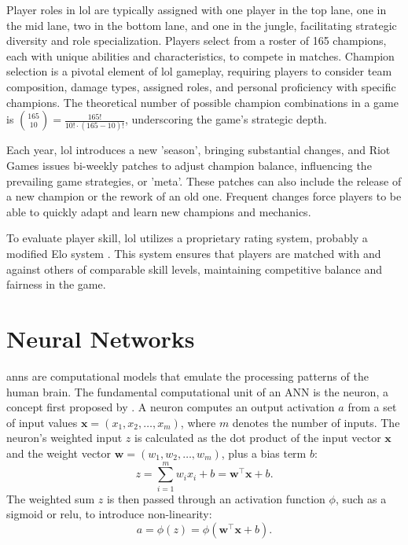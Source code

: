 \documentclass[12pt, a4paper, headinclude, twoside, plainheadsepline, open=right, numbers=noenddot, hidelinks, toc=listof, toc=bibliography]{scrreprt}
\begin{document}
Player roles in \ac{lol} are typically assigned with one player in the top lane, one in the mid lane, two in the bottom lane, and one in the jungle, facilitating strategic diversity and role specialization.
Players select from a roster of 165 champions, each with unique abilities and characteristics, to compete in matches.
Champion selection is a pivotal element of \ac{lol} gameplay, requiring players to consider team composition, damage types, assigned roles, and personal proficiency with specific champions. 
The theoretical number of possible champion combinations in a game is $\binom{165}{10} = \frac{165!}{10! \cdot (165-10)!}$, underscoring the game's strategic depth.

Each year, \ac{lol} introduces a new 'season', bringing substantial changes, and Riot Games issues bi-weekly patches to adjust champion balance, influencing the prevailing game strategies, or 'meta'.
These patches can also include the release of a new champion or the rework of an old one.
Frequent changes force players to be able to quickly adapt and learn new champions and mechanics.

To evaluate player skill, \ac{lol} utilizes a proprietary rating system, probably a modified Elo system \cite{janssonNeuralNetworksStandardizing2022}.
This system ensures that players are matched with and against others of comparable skill levels, maintaining competitive balance and fairness in the game.


\section{Neural Networks}
\label{sec:nn}

\Acp{ann} are computational models that emulate the processing patterns of the human brain. The fundamental computational unit of an ANN is the neuron, a concept first proposed by \citeauthor{mccullochLogicalCalculusIdeas1943} \cite{mccullochLogicalCalculusIdeas1943}. 
A neuron computes an output activation $a$ from a set of input values $\mathbf{x} = (x_1, x_2, \ldots, x_m)$, where $m$ denotes the number of inputs. 
The neuron's weighted input $z$ is calculated as the dot product of the input vector $\mathbf{x}$ and the weight vector $\mathbf{w} = (w_1, w_2, \ldots, w_m)$, plus a bias term $b$:
\begin{equation}
z = \sum_{i=1}^{m} w_i x_i + b = \mathbf{w}^\top \mathbf{x} + b.
\end{equation}
The weighted sum $z$ is then passed through an activation function $\phi$, such as a sigmoid or \ac{relu}, to introduce non-linearity:
\begin{equation}
a = \phi(z) = \phi(\mathbf{w}^\top \mathbf{x} + b).
\end{equation}
\end{document}
